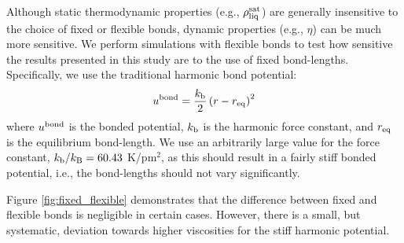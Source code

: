 \documentclass[preprint,review,11pt]{elsarticle}
\begin{document}
	
    Although static thermodynamic properties (e.g., $\rho_{\rm liq}^{\rm sat}$) are generally insensitive to the choice of fixed or flexible bonds, dynamic properties (e.g., $\eta$) can be much more sensitive. We perform simulations with flexible bonds to test how sensitive the results presented in this study are to the use of fixed bond-lengths. Specifically, we use the traditional harmonic bond potential:
    \begin{equation} \label{eq:harmonic_bond}
    u^{\rm bond} = \frac{k_{\rm b}}{2} \left(r-r_{\rm eq}\right)^2
    \end{equation}
    where $u^{\rm bond}$ is the bonded potential, $k_{\rm b}$ is the harmonic force constant, and $r_{\rm eq}$ is the equilibrium bond-length. We use an arbitrarily large value for the force constant, $k_{\rm b}/k_{\rm B} = 60.43$ K/pm$^2$, as this should result in a fairly stiff bonded potential, i.e., the bond-lengths should not vary significantly.
    
    
    Figure \ref{fig:fixed_flexible} demonstrates that the difference between fixed and flexible bonds is negligible in certain cases. However, there is a small, but systematic, deviation towards higher viscosities for the stiff harmonic potential. 
    
\end{document}
